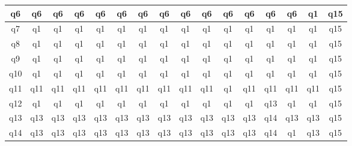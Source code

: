 \begin{table}[H]
{\begin{tabular}{|c*{15}{|c}|}
            q6             & q6                 & q6              & q6                  & q6         & q6         & q6                 & q6                    & q6         & q6          & q6          & q6         & q6         & q6         & q1         & q15          \\ \hline
            q7             & q1                 & q1              & q1                  & q1         & q1         & q1                 & q1                    & q1         & q1          & q1          & q1         & q1         & q1         & q1         & q15          \\ \hline
            q8             & q1                 & q1              & q1                  & q1         & q1         & q1                 & q1                    & q1         & q1          & q1          & q1         & q1         & q1         & q1         & q15          \\ \hline
            q9             & q1                 & q1              & q1                  & q1         & q1         & q1                 & q1                    & q1         & q1          & q1          & q1         & q1         & q1         & q1         & q15          \\ \hline
            q10            & q1                 & q1              & q1                  & q1         & q1         & q1                 & q1                    & q1         & q1          & q1          & q1         & q1         & q1         & q1         & q15          \\ \hline
            q11            & q11                & q11             & q11                 & q11        & q11        & q11                & q11                   & q11        & q11         & q1          & q11        & q11        & q11        & q11        & q15          \\ \hline
            q12            & q1                 & q1              & q1                  & q1         & q1         & q1                 & q1                    & q1         & q1          & q1          & q1         & q13        & q1         & q1         & q15          \\ \hline
            q13            & q13                & q13             & q13                 & q13        & q13        & q13                & q13                   & q13        & q13         & q13         & q13        & q14        & q13        & q13        & q15          \\ \hline
            q14            & q13                & q13             & q13                 & q13        & q13        & q13                & q13                   & q13        & q13         & q13         & q13        & q14        & q1         & q13        & q15          \\ \hline

\end{tabular}}
\end{table}
